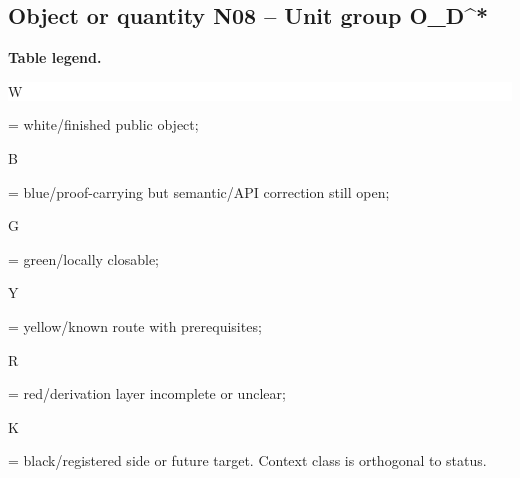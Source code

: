 \subsection*{Object or quantity N08 -- Unit group O\_D\textasciicircum{}*}
\hypertarget{objproof:N08}{}
\par\smallskip\noindent\begin{minipage}{0.99\linewidth}\footnotesize\raggedright\textbf{Table legend.} \colorbox{white}{\strut W} = white/finished public object; \colorbox{cyan!20}{\strut B} = blue/proof-carrying but semantic/API correction still open; \colorbox{green!18}{\strut G} = green/locally closable; \colorbox{yellow!25}{\strut Y} = yellow/known route with prerequisites; \colorbox{red!20}{\strut R} = red/derivation layer incomplete or unclear; \colorbox{black!18}{\strut K} = black/registered side or future target. Context class is orthogonal to status.\end{minipage}\par\vspace{0.25em}
